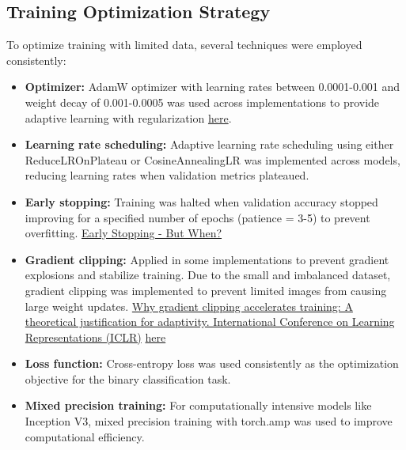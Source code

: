 \documentclass[a4paper,12pt]{article}
\begin{document}
\subsection{Training Optimization Strategy} 

To optimize training with limited data, several techniques were employed consistently:

\begin{itemize}
    \item \textbf{Optimizer:} AdamW optimizer with learning rates between 0.0001-0.001 and weight decay of 0.001-0.0005 was used across implementations to provide adaptive learning with regularization \href{https://openreview.net/forum?id=Bkg6RiCqY7}{here}.
    
    \item \textbf{Learning rate scheduling:} Adaptive learning rate scheduling using either ReduceLROnPlateau or CosineAnnealingLR was implemented across models, reducing learning rates when validation metrics plateaued.
    
    \item \textbf{Early stopping:} Training was halted when validation accuracy stopped improving for a specified number of epochs (patience = 3-5) to prevent overfitting. \href{https://link.springer.com/chapter/10.1007/3-540-49430-8_3}{Early Stopping - But When?} 
    
    \item \textbf{Gradient clipping:} Applied in some implementations to prevent gradient explosions and stabilize training. Due to the small and imbalanced dataset, gradient clipping was implemented to prevent limited images from causing large weight updates. \href{Zhang, J., He, T., Sra, S., & Jadbabaie, A. (2020). Why gradient clipping accelerates training: A theoretical justification for adaptivity. International Conference on Learning Representations (ICLR).}{Why gradient clipping accelerates training: A theoretical justification for adaptivity. International Conference on Learning Representations (ICLR)} \href{http://proceedings.mlr.press/v28/pascanu13.pdf}{here}
    
    \item \textbf{Loss function:} Cross-entropy loss was used consistently as the optimization objective for the binary classification task.
    
    \item \textbf{Mixed precision training:} For computationally intensive models like Inception V3, mixed precision training with torch.amp was used to improve computational efficiency.
\end{itemize}
\end{document}

